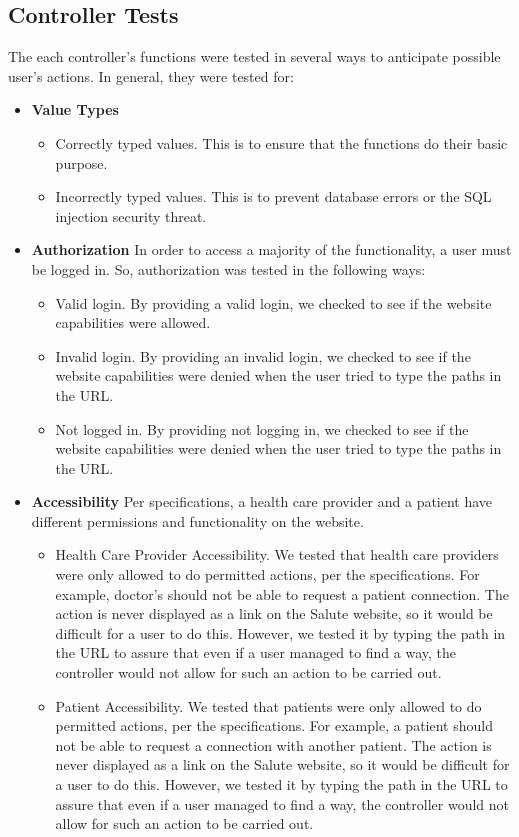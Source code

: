 \documentclass[12pt]{report}
\begin{document}
\subsection{Controller Tests}
The each controller's functions were tested in several ways to anticipate possible user's actions. In general, they were tested for:
\begin{itemize}
\item \textbf{Value Types}
\begin{itemize}
\item Correctly typed values. This is to ensure that the functions do their basic purpose.
\item Incorrectly typed values. This is to prevent database errors or the SQL injection security threat.
\end{itemize}
\item \textbf{Authorization} In order to access a majority of the functionality, a user must be logged in. So, authorization was tested in the following ways: 
\begin{itemize}
\item  Valid login. By providing a valid login, we checked to see if the website capabilities were allowed. 
\item Invalid login. By providing an invalid login, we checked to see if the website capabilities were denied when the user tried to type the paths in the URL.
\item Not logged in. By providing not logging in, we checked to see if the website capabilities were denied when the user tried to type the paths in the URL.
\end{itemize}
\item\textbf{Accessibility} Per specifications, a health care provider and a patient have different permissions and functionality on the website. 
\begin{itemize}
\item Health Care Provider Accessibility. We tested that health care providers were only allowed to do permitted actions, per the specifications. For example, doctor's should not be able to request a patient connection. The action is never displayed as a link on the Salute website, so it would be difficult for a user to do this. However, we tested it by typing the path in the URL to assure that even if a user managed to find a way, the controller would not allow for such an action to be carried out. 
\item Patient Accessibility. We tested that patients were only allowed to do permitted actions, per the specifications. For example, a patient should not be able to request a connection with another patient. The action is never displayed as a link on the Salute website, so it would be difficult for a user to do this. However, we tested it by typing the path in the URL to assure that even if a user managed to find a way, the controller would not allow for such an action to be carried out. 

\end{itemize}
\end{itemize}
\end{document}
